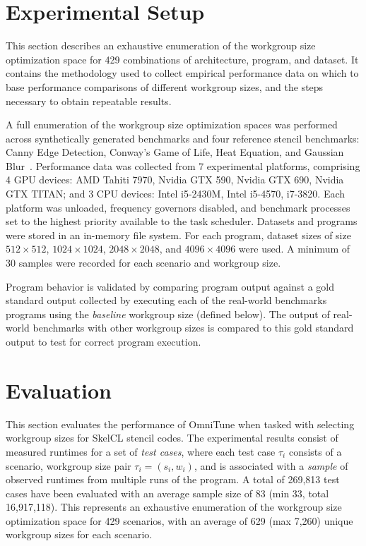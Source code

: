 \documentclass[nonatbib,preprint,nocopyrightspace,9pt]{sigplanconf}
\begin{document}
\section{Experimental Setup}

This section describes an exhaustive enumeration of the workgroup size
optimization space for 429 combinations of architecture, program, and
dataset. It contains the methodology used to collect empirical
performance data on which to base performance comparisons of different
workgroup sizes, and the steps necessary to obtain repeatable results.

A full enumeration of the workgroup size optimization spaces was
performed across synthetically generated benchmarks and four reference
stencil benchmarks: Canny Edge Detection, Conway's Game of Life, Heat
Equation, and Gaussian Blur~\cite{Steuwer2011}. Performance data was
collected from 7 experimental platforms, comprising 4 GPU devices: AMD
Tahiti 7970, Nvidia GTX 590, Nvidia GTX 690, Nvidia GTX TITAN; and 3
CPU devices: Intel i5-2430M, Intel i5-4570, i7-3820. Each platform was
unloaded, frequency governors disabled, and benchmark processes set to
the highest priority available to the task scheduler. Datasets and
programs were stored in an in-memory file system. For each program,
dataset sizes of size $512\times512$, $1024\times1024$,
$2048\times2048$, and $4096\times4096$ were used. A minimum of 30
samples were recorded for each scenario and workgroup size.

Program behavior is validated by comparing program output against a
gold standard output collected by executing each of the real-world
benchmarks programs using the \emph{baseline} workgroup size (defined
below). The output of real-world benchmarks with other workgroup sizes
is compared to this gold standard output to test for correct program
execution.


\section{Evaluation}\label{sec:evaluation}

This section evaluates the performance of OmniTune when tasked with
selecting workgroup sizes for SkelCL stencil codes. The experimental
results consist of measured runtimes for a set of \emph{test cases},
where each test case $\tau_i$ consists of a scenario, workgroup size
pair $\tau_i = (s_i,w_i)$, and is associated with a \emph{sample} of
observed runtimes from multiple runs of the program. A total of
269,813 test cases have been evaluated with an average sample size of
83 (min 33, total 16,917,118). This represents an exhaustive
enumeration of the workgroup size optimization space for 429
scenarios, with an average of 629 (max 7,260) unique workgroup sizes
for each scenario.
\end{document}

